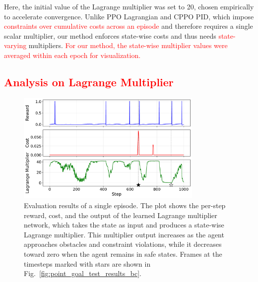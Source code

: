 Here, the initial value of the Lagrange multiplier was set to 20, chosen empirically to accelerate convergence.
Unlike PPO Lagrangian and CPPO PID, which impose \textcolor{red}{constraints over cumulative costs across an episode} and therefore requires a single scalar multiplier, our method enforces state-wise costs and thus needs \textcolor{red}{state-varying} multipliers.  %
\textcolor{red}{For our method, the state-wise multiplier values were averaged within each epoch for visualization.}

\subsection{\textcolor{red}{Analysis on Lagrange Multiplier}}

\begin{figure}[H]
    \centering
    \includegraphics[width=0.8\textwidth]{figure/test/result.pdf}
    \caption{Evaluation results of a single episode.
            The plot shows the per-step reward, cost, and the output of the learned Lagrange multiplier network, which takes the state as input and produces a state-wise Lagrange multiplier.
            This multiplier output increases as the agent approaches obstacles and constraint violations, while it decreases toward zero when the agent remains in safe states.
            Frames at the timesteps marked with stars are shown in Fig.~\ref{fig:point_goal_test_results_bc}.}
    \label{fig:point_goal_test_results_a}
\end{figure}

